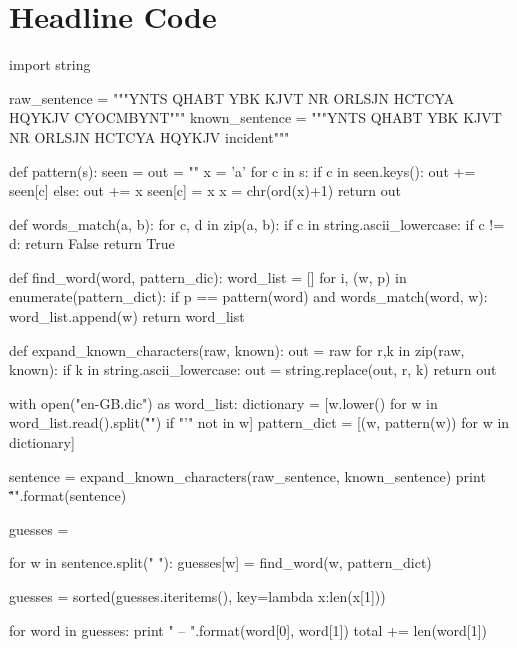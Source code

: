 \documentclass[11pt,a4paper,twoside]{article}
\begin{document}
\section{Headline Code}
\label{headline_code}
\begin{python}
import string


raw_sentence =   """YNTS QHABT YBK KJVT NR ORLSJN 
                 HCTCYA HQYKJV CYOCMBYNT"""
known_sentence = """YNTS QHABT YBK KJVT NR ORLSJN 
                 HCTCYA HQYKJV incident"""


def pattern(s):
    seen = {}
    out = ""
    x = 'a'
    for c in s:
        if c in seen.keys():
            out += seen[c]
        else:
            out += x
            seen[c] = x
            x = chr(ord(x)+1)
    return out

def words_match(a, b):
    for c, d in zip(a, b):
        if c in string.ascii_lowercase:
            if c != d:
                return False
    return True

def find_word(word, pattern_dic):
    word_list = []
    for i, (w, p) in enumerate(pattern_dict):
        if p == pattern(word) and words_match(word, w):
            word_list.append(w)
    return word_list

def expand_known_characters(raw, known):
    out = raw
    for r,k in zip(raw, known): 
      if k in string.ascii_lowercase:
          out = string.replace(out, r, k)
    return out

with open("en-GB.dic") as word_list:
    dictionary = [w.lower() for w 
                  in word_list.read().split("\r\n") 
                  if "'" not in w]
    pattern_dict = [(w, pattern(w)) for w in dictionary]

sentence = expand_known_characters(raw_sentence, 
                                   known_sentence)
print "\"{}\"\n".format(sentence)

guesses = {}

for w in sentence.split(" "):
    guesses[w] = find_word(w, pattern_dict)

guesses = sorted(guesses.iteritems(), key=lambda x:len(x[1]))

for word in guesses:
    print "{} -- {}\n".format(word[0], word[1])
    total += len(word[1])
\end{python}


\end{document}
